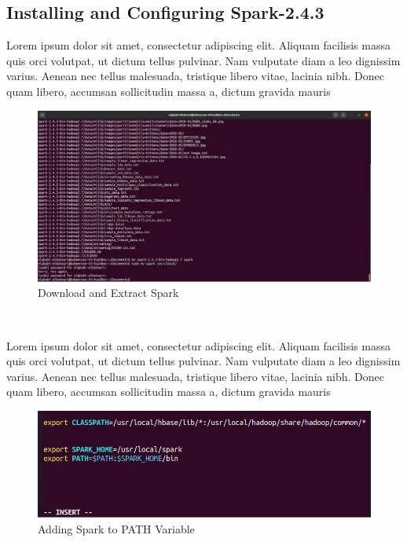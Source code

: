 \begin{spacing}{1.2}
\section{Installing and Configuring Spark-2.4.3 }
\par Lorem ipsum dolor sit amet, consectetur adipiscing elit. Aliquam facilisis massa quis orci volutpat, ut dictum tellus pulvinar. Nam vulputate diam a leo dignissim varius. Aenean nec tellus malesuada, tristique libero vitae, lacinia nibh. Donec quam libero, accumsan sollicitudin massa a, dictum gravida mauris
\\
\begin{figure}[!htb] 
\begin{center} 
\includegraphics[width=1\linewidth]{Pictures/HBase/Data processing with Spark/Installing and Configuring Spark-2.4.3/Download and Extract Spark} 
\end{center} 
\caption{Download and Extract Spark} 
\end{figure}  \FloatBarrier
\\

\par Lorem ipsum dolor sit amet, consectetur adipiscing elit. Aliquam facilisis massa quis orci volutpat, ut dictum tellus pulvinar. Nam vulputate diam a leo dignissim varius. Aenean nec tellus malesuada, tristique libero vitae, lacinia nibh. Donec quam libero, accumsan sollicitudin massa a, dictum gravida mauris
\\
\begin{figure}[!htb] 
\begin{center} 
\includegraphics[width=1\linewidth]{Pictures/HBase/Data processing with Spark/Installing and Configuring Spark-2.4.3/Adding Spark to PATH Variable} 
\end{center} 
\caption{Adding Spark to PATH Variable} 
\end{figure}  \FloatBarrier
\\


\end{spacing}
